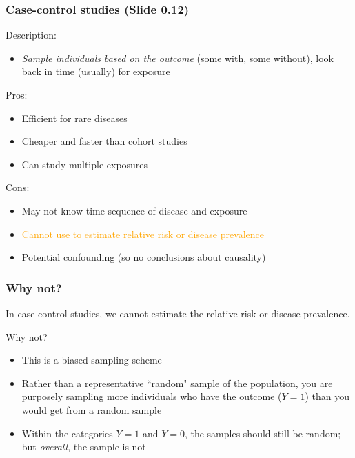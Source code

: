 \documentclass[12pt, 
hyperref={colorlinks=true, linkcolor=blue, urlcolor=cyan}]{beamer}
\begin{document}
\begin{frame}[noframenumbering]
\frametitle{Case-control studies (Slide 0.12)}
Description: \vspace{-0.3cm}
\begin{itemize}
\item \textit{Sample individuals based on the outcome} (some with, some without), look back in time (usually) for exposure %
\end{itemize}

Pros:\vspace{-0.3cm}
\begin{itemize}
\item Efficient for rare diseases %
\item Cheaper and faster than cohort studies
\item Can study multiple exposures
\end{itemize}

Cons:\vspace{-0.3cm}
\begin{itemize}
\item May not know time sequence of disease and exposure
\item \textcolor{orange}{Cannot use to estimate relative risk or disease prevalence}
\item Potential confounding (so no conclusions about causality)
\end{itemize}
\end{frame}

\begin{frame}
\frametitle{Why not?}

In case-control studies, we cannot estimate the relative risk or disease prevalence.

Why not? 
\begin{itemize}
\item This is a biased sampling scheme 
\item Rather than a representative ``random" sample of the population, you are purposely sampling more individuals who have the outcome ($Y = 1$) than you would get from a random sample 
\item Within the categories $Y = 1$ and $Y = 0$, the samples should still be random; but \textit{overall}, the sample is not 
\end{itemize}

\end{frame}
\end{document}

